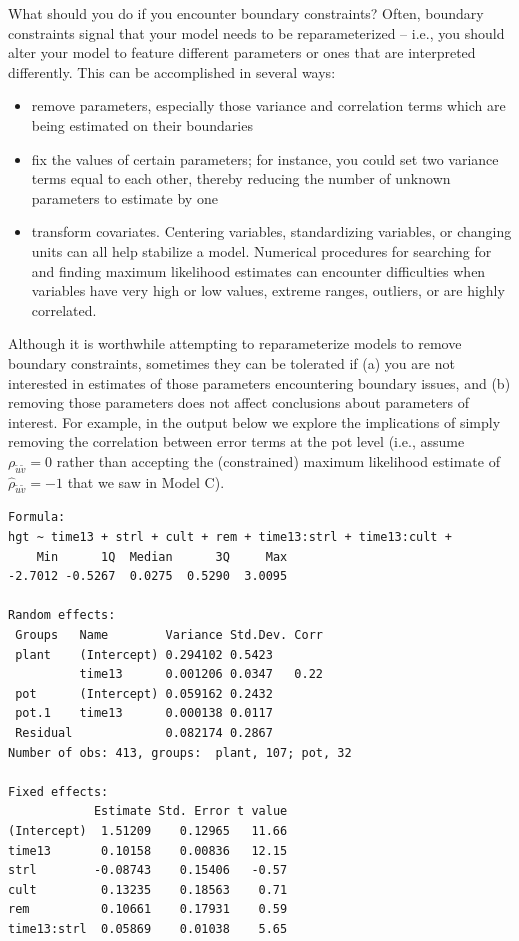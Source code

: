 \documentclass[
]{krantz}
\providecommand{\tightlist}{%
  \setlength{\itemsep}{0pt}\setlength{\parskip}{0pt}}
\begin{document}
What should you do if you encounter boundary constraints? Often, boundary constraints signal that your model needs to be reparameterized -- i.e., you should alter your model to feature different parameters or ones that are interpreted differently. This can be accomplished in several ways:

\begin{itemize}
\tightlist
\item
  remove parameters, especially those variance and correlation terms which are being estimated on their boundaries
\item
  fix the values of certain parameters; for instance, you could set two variance terms equal to each other, thereby reducing the number of unknown parameters to estimate by one
\item
  transform covariates. Centering variables, standardizing variables, or changing units can all help stabilize a model. Numerical procedures for searching for and finding maximum likelihood estimates can encounter difficulties when variables have very high or low values, extreme ranges, outliers, or are highly correlated.
\end{itemize}

Although it is worthwhile attempting to reparameterize models to remove boundary constraints, sometimes they can be tolerated if (a) you are not interested in estimates of those parameters encountering boundary issues, and (b) removing those parameters does not affect conclusions about parameters of interest. For example, in the output below we explore the implications of simply removing the correlation between error terms at the pot level (i.e., assume \(\rho_{\tilde{u}\tilde{v}}=0\) rather than accepting the (constrained) maximum likelihood estimate of \(\hat{\rho}_{\tilde{u}\tilde{v}}=-1\) that we saw in Model C).

\begin{verbatim}
Formula: 
hgt ~ time13 + strl + cult + rem + time13:strl + time13:cult +  
    Min      1Q  Median      3Q     Max 
-2.7012 -0.5267  0.0275  0.5290  3.0095 

Random effects:
 Groups   Name        Variance Std.Dev. Corr
 plant    (Intercept) 0.294102 0.5423       
          time13      0.001206 0.0347   0.22
 pot      (Intercept) 0.059162 0.2432       
 pot.1    time13      0.000138 0.0117       
 Residual             0.082174 0.2867       
Number of obs: 413, groups:  plant, 107; pot, 32

Fixed effects:
            Estimate Std. Error t value
(Intercept)  1.51209    0.12965   11.66
time13       0.10158    0.00836   12.15
strl        -0.08743    0.15406   -0.57
cult         0.13235    0.18563    0.71
rem          0.10661    0.17931    0.59
time13:strl  0.05869    0.01038    5.65
\end{verbatim}
\end{document}
